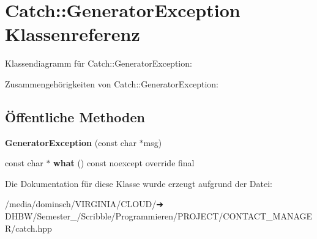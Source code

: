 \hypertarget{classCatch_1_1GeneratorException}{}\section{Catch\+:\+:Generator\+Exception Klassenreferenz}
\label{classCatch_1_1GeneratorException}


Klassendiagramm für Catch\+:\+:Generator\+Exception\+:


Zusammengehörigkeiten von Catch\+:\+:Generator\+Exception\+:
\subsection*{Öffentliche Methoden}
\begin{DoxyCompactItemize}
\item 
\mbox{\label{classCatch_1_1GeneratorException_a3cf9282d555ec32389665ce723bf36ea}} 
{\bfseries Generator\+Exception} (const char $\ast$msg)
\item 
\mbox{\label{classCatch_1_1GeneratorException_ade029163144d136f12187e5b9a0161d5}} 
const char $\ast$ {\bfseries what} () const noexcept override final
\end{DoxyCompactItemize}


Die Dokumentation für diese Klasse wurde erzeugt aufgrund der Datei\+:\begin{DoxyCompactItemize}
\item 
/media/dominsch/\+V\+I\+R\+G\+I\+N\+I\+A/\+C\+L\+O\+U\+D/➔ D\+H\+B\+W/\+Semester\+\_/\+Scribble/\+Programmieren/\+P\+R\+O\+J\+E\+C\+T/\+C\+O\+N\+T\+A\+C\+T\+\_\+\+M\+A\+N\+A\+G\+E\+R/catch.\+hpp\end{DoxyCompactItemize}
